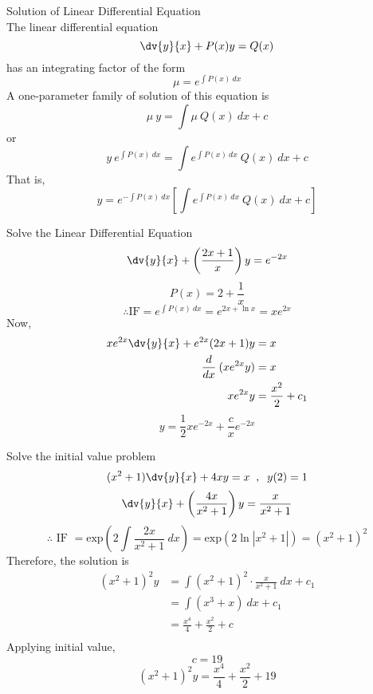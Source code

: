 \begin{theorem}{Solution of Linear Differential Equation}{}
    \\The linear differential equation \[
        \dv{y}{x} + P(x)y = Q(x)
    \] has an integrating factor of the form
    \begin{equation}
        \mu = e^{\int{P(x)} \: d{x}}
    \end{equation}
    A one-parameter family of solution of this equation is \[
        \mu \: y = \int{\mu \: Q(x)} \: d{x} + c
    \] or
    \begin{equation}
        y \: e^{\int{P(x)} \: d{x}} = \int{e^{\int{P(x)} \: d{x}} \: Q(x)} \: d{x} + c
    \end{equation}
    That is,
    \begin{equation}
        y = e^{-\int{P(x)} \: d{x}} \left[ \int{e^{\int{P(x)} \: d{x}} \: Q(x)} \: d{x} + c \right]
    \end{equation}
\end{theorem}

\begin{example}{
    Solve the Linear Differential Equation
    \[ \dv{y}{x} + \left( \frac{2x+1}{x} \right) y = e^{-2x} \]
    }{} \vspace{-20pt}
    \[ P(x) = 2 + \frac{1}{x} \]
    \[ \therefore \text{IF} = e^{\int{P(x)} \: d{x}} = e^{2x + \ln x} = xe^{2x} \]
    Now,
    \begin{align*}
        xe^{2x}\dv{y}{x} + e^{2x}(2x+1)y &= x \\
        \frac{d}{d{x}} \: (xe^{2x}y) &= x \\
        xe^{2x}y &= \frac{x^2}{2} + c_1
    \end{align*}
    \[ \boxed{ y = \frac{1}{2} xe^{-2x} + \frac{c}{x} e^{-2x} } \]
\end{example}

\begin{example}{Solve the initial value problem \[
    (x^2+1)\dv{y}{x} + 4xy = x \;\;,\;\; y(2)=1
\]}{} \vspace{-20pt}
    \[ \dv{y}{x} + \left( \frac{4x}{x^2+1} \right) y = \frac{x}{x^2+1} \]
    \[ \therefore \text{ IF } = \text{exp}\left( 2\int{\frac{2x}{x^2+1}} \: d{x} \right) = \text{exp}\left( 2\ln|x^2+1| \right) = (x^2+1)^2 \]
    Therefore, the solution is
    \begin{align*}
        (x^2+1)^2 y &= \int{ (x^2+1)^2 \cdot \frac{x}{x^2+1} } \: d{x} + c_1 \\
        &= \int{ (x^3+x) } \: d{x} + c_1 \\
        &= \frac{x^4}{4} + \frac{x^2}{2} + c \\
    \end{align*}
    Applying initial value, 
    \[ c = 19 \]
    \[ \boxed{ (x^2+1)^2 y = \frac{x^4}{4} + \frac{x^2}{2} + 19 } \]
\end{example}

